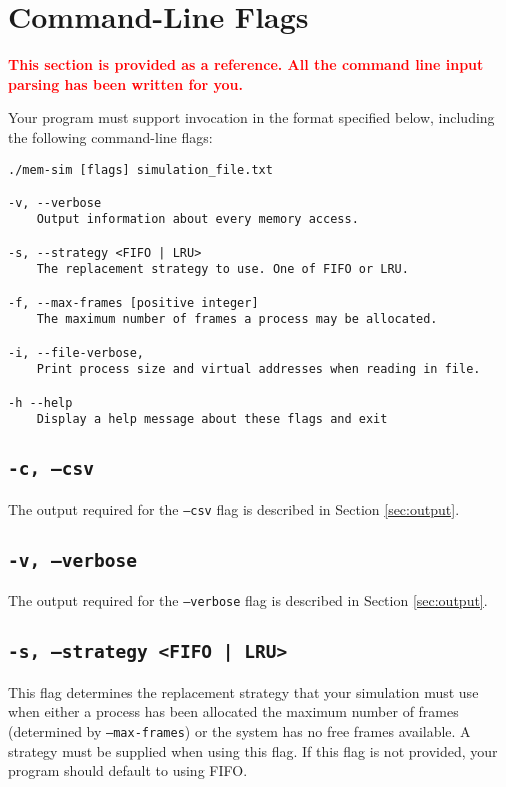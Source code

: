 \documentclass[10pt]{article}
\begin{document}

\section{Command-Line Flags}
\label{sec:flags}

\textcolor{red}{\textbf{This section is provided as a reference. All the command line input parsing has been written for you.}}

Your program must support invocation in the format specified below, including the following command-line flags:

\begin{verbatim}
./mem-sim [flags] simulation_file.txt

-v, --verbose
    Output information about every memory access.

-s, --strategy <FIFO | LRU>
    The replacement strategy to use. One of FIFO or LRU.

-f, --max-frames [positive integer]
    The maximum number of frames a process may be allocated.
    
-i, --file-verbose,
    Print process size and virtual addresses when reading in file.
    
-h --help
    Display a help message about these flags and exit
\end{verbatim}

\subsection{\texttt{-c, --csv}}

The output required for the \texttt{--csv} flag is described in Section \ref{sec:output}.

\subsection{\texttt{-v, --verbose}}

The output required for the \texttt{--verbose} flag is described in Section \ref{sec:output}.

\subsection{\texttt{-s, --strategy <FIFO | LRU>}}

This flag determines the replacement strategy that your simulation must use when either a process has been allocated the maximum number of frames (determined by \texttt{--max-frames}) or the system has no free frames available. A strategy must be supplied when using this flag. If this flag is not provided, your program should default to using FIFO.
\end{document}
